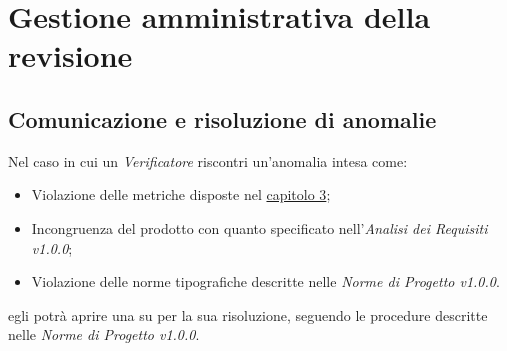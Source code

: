 \chapter{Gestione amministrativa della revisione}
\section{Comunicazione e risoluzione di anomalie}

Nel caso in cui un \textit{Verificatore} riscontri un'anomalia intesa come:

\begin{itemize}
	\item Violazione delle metriche disposte nel \hyperref[Metriche]{capitolo 3};
	\item Incongruenza del prodotto con quanto specificato nell'\textit{Analisi dei Requisiti v1.0.0};
	\item Violazione delle norme tipografiche descritte nelle \textit{Norme di Progetto v1.0.0}.
\end{itemize}

egli potrà aprire una  su  per la sua risoluzione, seguendo le procedure descritte nelle \textit{Norme di Progetto v1.0.0}.
